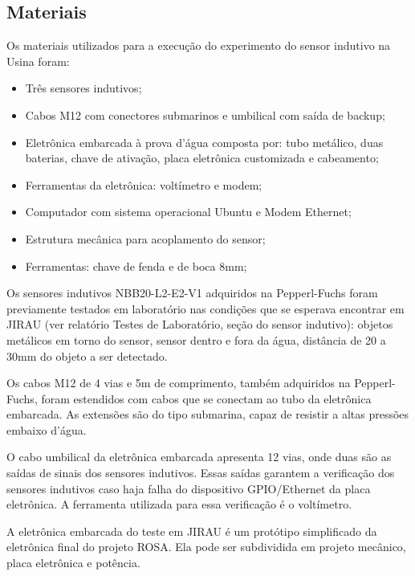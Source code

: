 



\subsection{Materiais}
Os materiais utilizados para a execução do experimento do sensor indutivo na
Usina foram:
\begin{itemize}
  \item Três sensores indutivos;
  \item Cabos M12 com conectores submarinos e umbilical com saída de backup;
  \item Eletrônica embarcada à prova d'água composta por: tubo metálico, duas
  baterias, chave de ativação, placa eletrônica customizada e cabeamento;
  \item Ferramentas da eletrônica: voltímetro e modem;
  \item Computador com sistema operacional Ubuntu e Modem Ethernet;
  \item Estrutura mecânica para acoplamento do sensor; 
  \item Ferramentas: chave de fenda e de boca 8mm;
\end{itemize}
Os sensores indutivos NBB20-L2-E2-V1 adquiridos na Pepperl-Fuchs foram
previamente testados em laboratório nas condições que se esperava encontrar em
JIRAU (ver relatório Testes de Laboratório, seção do sensor indutivo): objetos
metálicos em torno do sensor, sensor dentro e fora da água, distância de 20 a 30mm do objeto a ser detectado.

Os cabos M12 de 4 vias e 5m de comprimento, também adquiridos na Pepperl-Fuchs,
foram estendidos com cabos que se conectam ao tubo da eletrô\-nica embarcada.
As extensões são do tipo submarina, capaz de resistir a altas pressões embaixo
d'água. 

O cabo umbilical da eletrônica embarcada apresenta 12 vias, onde duas são as
saídas de sinais dos sensores indutivos. Essas saídas garantem a
verificação dos sensores indutivos caso haja falha do dispositivo GPIO/Ethernet
da placa eletrônica. A ferramenta utilizada para essa verificação é o
voltímetro.

A eletrônica embarcada do teste em JIRAU é um protótipo simplificado da
eletrônica final do projeto ROSA. Ela pode ser subdividida em projeto
mecânico, placa eletrônica e potência. 

